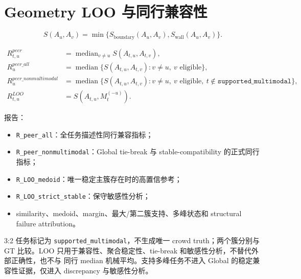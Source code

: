 \section{Geometry LOO 与同行兼容性}

\[
S(A_u,A_v)=\min\{S_{\mathrm{boundary}}(A_u,A_v),
S_{\mathrm{wall}}(A_u,A_v)\}.
\]

\begin{align*}
R^{peer}_{t,u}&=\operatorname{median}_{v\neq u}S(A_{t,u},A_{t,v}),\\
R^{peer\_all}_{u}&=\operatorname{median}\{S(A_{t,u},A_{t,v}):v\neq u,\ v\text{ eligible}\},\\
R^{peer\_nonmultimodal}_{u}&=\operatorname{median}\{S(A_{t,u},A_{t,v}):v\neq u,\ v\text{ eligible},\
t\notin\texttt{supported\_multimodal}\},\\
R^{LOO}_{t,u}&=S(A_{t,u},M_t^{(-u)}).
\end{align*}

报告：
\begin{itemize}
  \item \texttt{R\_peer\_all}：全任务描述性同行兼容指标；
  \item \texttt{R\_peer\_nonmultimodal}：Global tie-break 与 stable-compatibility 的正式同行指标；
  \item \texttt{R\_LOO\_medoid}：唯一稳定主簇存在时的高置信参考；
  \item \texttt{R\_LOO\_strict\_stable}：保守敏感性分析；
  \item similarity、medoid、margin、最大/第二簇支持、多峰状态和 structural failure attribution。
\end{itemize}

3:2 任务标记为 \texttt{supported\_multimodal}，不生成唯一 crowd truth；两个簇分别与 GT
比较。LOO 只用于兼容性、聚合稳定性、tie-break 和敏感性分析，不替代外部正确性，也不与
同行 median 机械平均。支持多峰任务不进入 Global 的稳定兼容性证据，仅进入 discrepancy
与敏感性分析。
